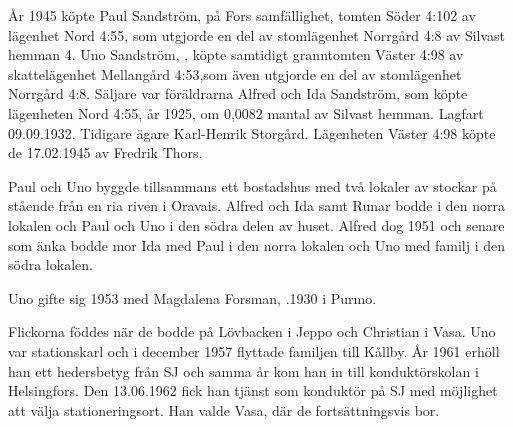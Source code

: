 År 1945 köpte Paul Sandström,  på Fors samfällighet, tomten Söder 4:102 av lägenhet Nord 4:55, som utgjorde en del av stomlägenhet Norrgård 4:8 av Silvast hemman 4. Uno Sandström, , köpte samtidigt granntomten Väster 4:98 av skattelägenhet Mellangård 4:53,som även utgjorde en del av stomlägenhet Norrgård 4:8.  Säljare var föräldrarna Alfred och Ida Sandström, som köpte lägenheten Nord 4:55, år 1925, om 0,0082 mantal av Silvast hemman. Lagfart 09.09.1932. Tidigare ägare Karl-Henrik Storgård. Lägenheten Väster 4:98 köpte de 17.02.1945 av Fredrik Thors.

Paul och Uno byggde tillsammans ett bostadshus med två lokaler av stockar på stående från en ria riven i Oravais. Alfred och Ida samt Runar bodde i den norra lokalen och Paul och Uno i den södra delen av huset. Alfred dog 1951 och senare som änka bodde mor Ida med Paul i den norra lokalen och Uno med familj i den södra lokalen.

Uno gifte sig 1953 med Magdalena Forsman, .1930  i Purmo.
\begin{jhchildren}
  \item {}
  \item {}
  \item {}
\end{jhchildren}
Flickorna föddes när de bodde på Lövbacken i Jeppo och Christian i Vasa. Uno var stationskarl och i december 1957 flyttade familjen till Kållby. År 1961 erhöll han ett hedersbetyg från SJ och samma år kom han in till konduktörskolan i Helsingfors. Den 13.06.1962 fick han tjänst som konduktör på SJ med möjlighet att välja stationeringsort. Han valde Vasa, där de fortsättningsvis bor.





\jhvspace{}



